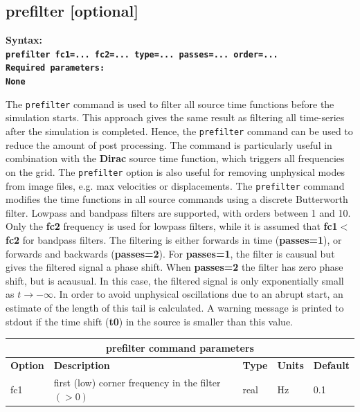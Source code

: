 \documentclass[11pt]{report}
\begin{document}
{\subsection{prefilter [optional]}\label{keyword:prefilter}
\begin{flushleft}
	\bf
	Syntax:\\
	\tt prefilter fc1=... fc2=... type=... passes=... order=...\\
	\bf
	Required parameters:\\
	\rm
	None
\end{flushleft}
The \verb+prefilter+ command is used to filter all source time functions before the simulation
starts. This approach gives the same result as filtering all time-series after the simulation is
completed. Hence, the \verb+prefilter+ command can be used to reduce the amount of post
processing. The command is particularly useful in combination with the {\bf Dirac} source time
function, which triggers all frequencies on the grid. The \verb+prefilter+ option is also useful for
removing unphysical modes from image files, e.g. max velocities or displacements.  The
\verb+prefilter+ command modifies the time functions in all source commands using a discrete
Butterworth filter. Lowpass and bandpass filters are supported, with orders between 1 and 10. Only
the {\bf fc2} frequency is used for lowpass filters, while it is assumed that {\bf fc1}$<${\bf fc2}
for bandpass filters. The filtering is either forwards in time ({\bf passes=1}), or forwards and
backwards ({\bf passes=2}). For {\bf passes=1}, the filter is causual but gives the filtered signal
a phase shift. When {\bf passes=2} the filter has zero phase shift, but is acausual. In this case,
the filtered signal is only exponentially small as $t\to-\infty$. In order to avoid unphysical
oscillations due to an abrupt start, an estimate of the length of this tail is calculated. A warning
message is printed to stdout if the time shift ({\bf t0}) in the source is smaller than this value.
\begin{center}
	\begin{tabular}{|l|p{8cm}|l|l|l|} \hline
		\multicolumn{5}{|c|}{\bf prefilter command parameters}                                                    \\ \hline
		\bf{Option} & \bf{Description}                                    & \bf{Type} & \bf{Units} & \bf{Default} \\
		\hline \hline
		fc1         & first (low) corner frequency in the filter $(>0)$   & real      & Hz         & 0.1          \\ \hline

\end{tabular}
\end{center}}
\end{document}

